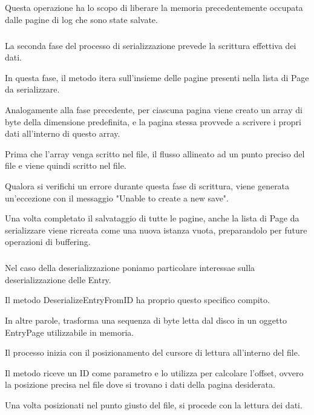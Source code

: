 \documentclass[12pt,a4paper,openright,twoside]{book}
\begin{document}
                    Questa operazione ha lo scopo di liberare la memoria precedentemente occupata dalle pagine di log che sono state salvate.

                    \subparagraph*{}

                    La seconda fase del processo di serializzazione prevede la scrittura effettiva dei dati.

                    In questa fase, il metodo itera sull'insieme delle pagine presenti nella lista di Page da serializzare.

                    Analogamente alla fase precedente, per ciascuna pagina viene creato un array di byte della dimensione predefinita, e la pagina stessa provvede a scrivere i propri dati all'interno di questo array.

                    Prima che l'array venga scritto nel file, il flusso allineato ad un punto preciso del file e viene quindi scritto nel file.

                    Qualora si verifichi un errore durante questa fase di scrittura, viene generata un'eccezione con il messaggio "Unable to create a new save".

                    Una volta completato il salvataggio di tutte le pagine, anche la lista di Page da serializzare viene ricreata come una nuova istanza vuota, preparandolo per future operazioni di buffering.

                    \subparagraph*{}

                    

                    Nel caso della deserializzazione poniamo particolare interessae sulla deserializzazione delle Entry.

                    Il metodo DeserializeEntryFromID ha proprio questo specifico compito.

                    In altre parole, trasforma una sequenza di byte letta dal disco in un oggetto EntryPage utilizzabile in memoria.

                    Il processo inizia con il posizionamento del cursore di lettura all'interno del file.

                    Il metodo riceve un ID come parametro e lo utilizza per calcolare l'offset, ovvero la posizione precisa nel file dove si trovano i dati della pagina desiderata.

                    Una volta posizionati nel punto giusto del file, si procede con la lettura dei dati.
\end{document}
